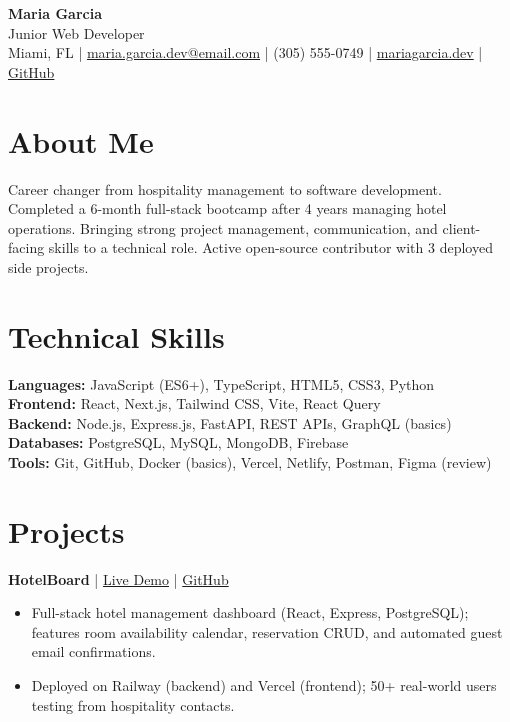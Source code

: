 \documentclass[11pt,a4paper]{article}
\begin{document}
\begin{center}
  {\LARGE \textbf{Maria Garcia}}\\[3pt]
  {\large \textcolor{accent}{Junior Web Developer}}\\[4pt]
  Miami, FL \quad|\quad
  \href{mailto:maria.garcia.dev@email.com}{maria.garcia.dev@email.com} \quad|\quad
  (305) 555-0749 \quad|\quad
  \href{https://mariagarcia.dev}{mariagarcia.dev} \quad|\quad
  \href{https://github.com/mariagarcia-dev}{GitHub}
\end{center}

\section{About Me}
Career changer from hospitality management to software development. Completed a 6-month full-stack bootcamp after 4 years managing hotel operations. Bringing strong project management, communication, and client-facing skills to a technical role. Active open-source contributor with 3 deployed side projects.

\section{Technical Skills}
\textbf{Languages:} JavaScript (ES6+), TypeScript, HTML5, CSS3, Python\\
\textbf{Frontend:} React, Next.js, Tailwind CSS, Vite, React Query\\
\textbf{Backend:} Node.js, Express.js, FastAPI, REST APIs, GraphQL (basics)\\
\textbf{Databases:} PostgreSQL, MySQL, MongoDB, Firebase\\
\textbf{Tools:} Git, GitHub, Docker (basics), Vercel, Netlify, Postman, Figma (review)

\section{Projects}

\noindent\textbf{HotelBoard} \textcolor{accent}{|} \href{https://hotelboard.mariagarcia.dev}{Live Demo} \textcolor{accent}{|} \href{https://github.com/mariagarcia-dev/hotelboard}{GitHub}
\begin{itemize}
  \item Full-stack hotel management dashboard (React, Express, PostgreSQL); features room availability calendar, reservation CRUD, and automated guest email confirmations.
  \item Deployed on Railway (backend) and Vercel (frontend); 50+ real-world users testing from hospitality contacts.
\end{itemize}
\end{document}
